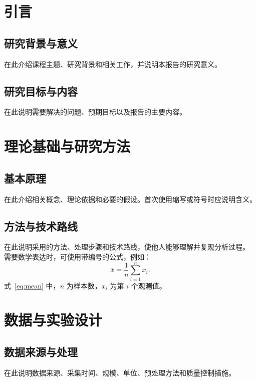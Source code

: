 \documentclass[UTF8,a4paper,zihao=-4,fontset=fandol]{ctexart}
\begin{document}
\MakeReportContents %
\StartReportBody

\section{引言}
\subsection{研究背景与意义}
在此介绍课程主题、研究背景和相关工作，并说明本报告的研究意义。

\subsection{研究目标与内容}
在此说明需要解决的问题、预期目标以及报告的主要内容。

\section{理论基础与研究方法}
\subsection{基本原理}
在此介绍相关概念、理论依据和必要的假设。首次使用缩写或符号时应说明含义。

\subsection{方法与技术路线}
在此说明采用的方法、处理步骤和技术路线，使他人能够理解并复现分析过程。
需要数学表达时，可使用带编号的公式，例如：
\begin{equation}
  \bar{x}=\frac{1}{n}\sum_{i=1}^{n}x_i .
  \label{eq:mean}
\end{equation}
式~\eqref{eq:mean} 中，$n$ 为样本数，$x_i$ 为第 $i$ 个观测值。

\section{数据与实验设计}
\subsection{数据来源与处理}
在此说明数据来源、采集时间、规模、单位、预处理方法和质量控制措施。
\end{document}
